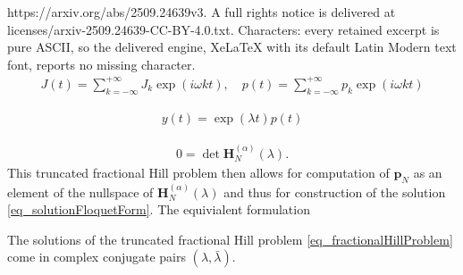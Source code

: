 \documentclass[10pt,a4paper]{amsart}
\newcommand{\hMat}{\mathbf H}
\newcommand{\pVec}{\mathbf p}
\begin{document}
https://arxiv.org/abs/2509.24639v3. A full rights notice is delivered at licenses/arxiv-2509.24639-CC-BY-4.0.txt. Characters: every retained excerpt is pure ASCII, so the delivered engine, XeLaTeX with its default Latin Modern text font, reports no missing character.
				\begin{align}\label{eq_FracHillFourierForm}
					J(t) = \sum_{k=-\infty}^{+\infty}J_k\exp(i\omega k t),\quad p(t) = \sum_{k=-\infty}^{+\infty}p_k\exp(i\omega k t)
				\end{align}

				\begin{align}\label{eq_solutionFloquetForm}
					y(t) = \exp(\lambda t)p(t)
				\end{align}

		\begin{align}\label{eq_fractionalHillProblem}
			0 = \det \hMat_{N}^{(\alpha)}(\lambda).
		\end{align} This truncated fractional Hill problem then allows for computation of $\pVec_N$ as an element of the nullspace of $\hMat_{N}^{(\alpha)}(\lambda)$ and thus for construction of the solution \eqref{eq_solutionFloquetForm}. The equivialent formulation

		\begin{proposition}\label{prop_ComplexConj}
			The solutions of the truncated fractional Hill problem \eqref{eq_fractionalHillProblem} come in complex conjugate pairs $(\lambda,\bar\lambda)$. 
		\end{proposition}
\end{document}
